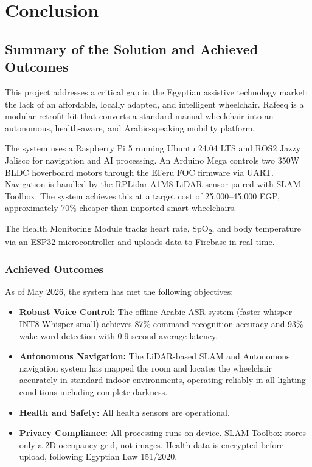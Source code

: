 \documentclass[12pt,a4paper]{report}
\begin{document}
\chapter{Conclusion}

\section{Summary of the Solution and Achieved Outcomes}

This project addresses a critical gap in the Egyptian assistive technology market: the lack of an affordable, locally adapted, and intelligent wheelchair. Rafeeq is a modular retrofit kit that converts a standard manual wheelchair into an autonomous, health-aware, and Arabic-speaking mobility platform.

The system uses a Raspberry Pi 5 running Ubuntu 24.04 LTS and ROS2 Jazzy Jalisco for navigation and AI processing. An Arduino Mega controls two 350W BLDC hoverboard motors through the EFeru FOC firmware via UART. Navigation is handled by the RPLidar A1M8 LiDAR sensor paired with SLAM Toolbox. The system achieves this at a target cost of 25,000--45,000 EGP, approximately 70\% cheaper than imported smart wheelchairs.

The Health Monitoring Module tracks heart rate, SpO\textsubscript{2}, and body temperature via an ESP32 microcontroller and uploads data to Firebase in real time. 

\subsection*{Achieved Outcomes}

As of May 2026, the system has met the following objectives:
\begin{itemize}
    \item \textbf{Robust Voice Control:} The offline Arabic ASR system (faster-whisper INT8 Whisper-small) achieves 87\% command recognition accuracy and 93\% wake-word detection with 0.9-second average latency.
    \item \textbf{Autonomous Navigation:} The LiDAR-based SLAM and Autonomous navigation system has mapped the room and locates the wheelchair accurately in standard indoor environments, operating reliably in all lighting conditions including complete darkness.
    \item \textbf{Health and Safety:} All health sensors are operational. 
    \item \textbf{Privacy Compliance:} All processing runs on-device. SLAM Toolbox stores only a 2D occupancy grid, not images. Health data is encrypted before upload, following Egyptian Law 151/2020.
\end{itemize}
\end{document}
